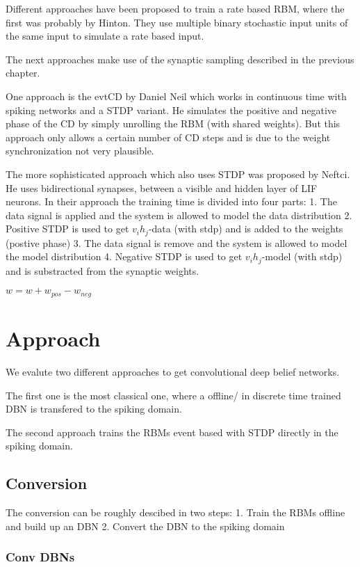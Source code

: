 Different approaches have been proposed to train a rate based RBM, where the first was probably by Hinton.
They use multiple binary stochastic input units of the same input to simulate a rate based input.

The next approaches make use of the synaptic sampling described in the previous chapter.

One approach is the evtCD by Daniel Neil which works in continuous time with spiking networks and a STDP variant.
He simulates the positive and negative phase of the CD by simply unrolling the RBM (with shared weights). 
But this approach only allows a certain number of CD steps and is due to the weight synchronization not very plausible.

The more sophisticated approach which also uses STDP was proposed by Neftci.
He uses bidirectional synapses, between a visible and hidden layer of LIF neurons.
In their approach the training time is divided into four parts:
1. The data signal is applied and the system is allowed to model the data distribution
2. Positive STDP is used to get $v_i h_j$-data (with stdp) and is added to the weights (postive phase)
3. The data signal is remove and the system is allowed to model the model distribution
4. Negative STDP is used to get $v_i h_j$-model (with stdp) and is substracted from the synaptic weights.

$w = w + w_{pos} - w_{neg}$

\chapter{Approach}

We evalute two different approaches to get convolutional deep belief networks.

The first one is the most classical one, where a offline/ in discrete time trained DBN is transfered to the spiking domain.

The second approach trains the RBMs event based with STDP directly in the spiking domain. 

\section{Conversion}

The conversion can be roughly descibed in two steps:
1. Train the RBMs offline and build up an DBN
2. Convert the DBN to the spiking domain

\subsection{Conv DBNs}


